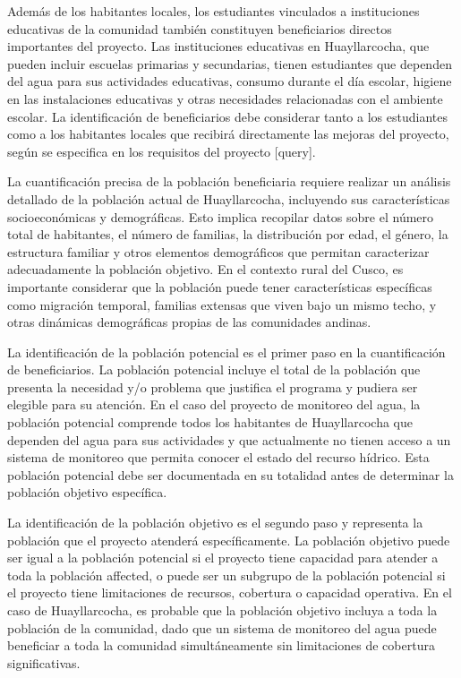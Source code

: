 Además de los habitantes locales, los estudiantes vinculados a instituciones educativas de la comunidad también constituyen beneficiarios directos importantes del proyecto. Las instituciones educativas en Huayllarcocha, que pueden incluir escuelas primarias y secundarias, tienen estudiantes que dependen del agua para sus actividades educativas, consumo durante el día escolar, higiene en las instalaciones educativas y otras necesidades relacionadas con el ambiente escolar. La identificación de beneficiarios debe considerar tanto a los estudiantes como a los habitantes locales que recibirá directamente las mejoras del proyecto, según se especifica en los requisitos del proyecto [query].

La cuantificación precisa de la población beneficiaria requiere realizar un análisis detallado de la población actual de Huayllarcocha, incluyendo sus características socioeconómicas y demográficas. Esto implica recopilar datos sobre el número total de habitantes, el número de familias, la distribución por edad, el género, la estructura familiar y otros elementos demográficos que permitan caracterizar adecuadamente la población objetivo. En el contexto rural del Cusco, es importante considerar que la población puede tener características específicas como migración temporal, familias extensas que viven bajo un mismo techo, y otras dinámicas demográficas propias de las comunidades andinas.

La identificación de la población potencial es el primer paso en la cuantificación de beneficiarios. La población potencial incluye el total de la población que presenta la necesidad y/o problema que justifica el programa y pudiera ser elegible para su atención. En el caso del proyecto de monitoreo del agua, la población potencial comprende todos los habitantes de Huayllarcocha que dependen del agua para sus actividades y que actualmente no tienen acceso a un sistema de monitoreo que permita conocer el estado del recurso hídrico. Esta población potencial debe ser documentada en su totalidad antes de determinar la población objetivo específica.

La identificación de la población objetivo es el segundo paso y representa la población que el proyecto atenderá específicamente. La población objetivo puede ser igual a la población potencial si el proyecto tiene capacidad para atender a toda la población affected, o puede ser un subgrupo de la población potencial si el proyecto tiene limitaciones de recursos, cobertura o capacidad operativa. En el caso de Huayllarcocha, es probable que la población objetivo incluya a toda la población de la comunidad, dado que un sistema de monitoreo del agua puede beneficiar a toda la comunidad simultáneamente sin limitaciones de cobertura significativas.

